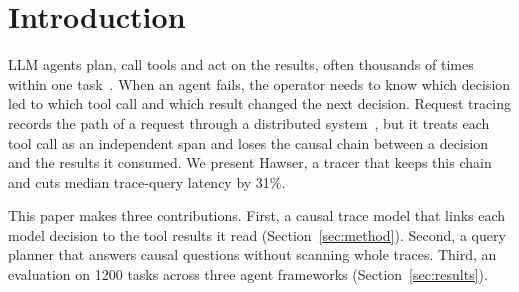 \section{Introduction}
\label{sec:intro}

LLM agents plan, call tools and act on the results, often thousands of times within one task~\cite{Wang2024,Park2023}.
When an agent fails, the operator needs to know which decision led to which tool call and which result changed the next decision.
Request tracing records the path of a request through a distributed system~\cite{Sambasivan2016,Kaldor2017}, but it treats each tool call as an independent span and loses the causal chain between a decision and the results it consumed.
We present Hawser, a tracer that keeps this chain and cuts median trace-query latency by 31\%.

This paper makes three contributions.
First, a causal trace model that links each model decision to the tool results it read (Section~\ref{sec:method}).
Second, a query planner that answers causal questions without scanning whole traces.
Third, an evaluation on 1200 tasks across three agent frameworks (Section~\ref{sec:results}).
